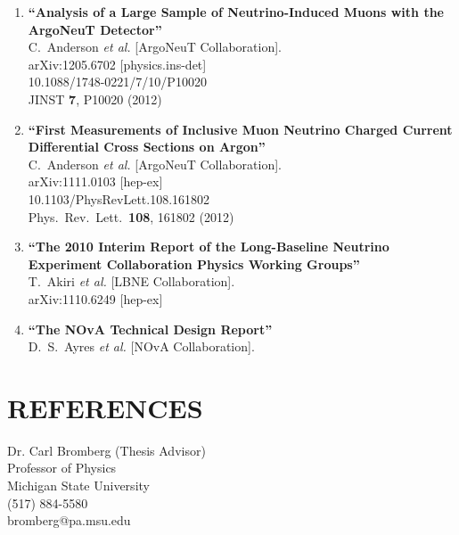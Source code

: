 \documentclass{res}
\begin{document}
\begin{resume}
\begin{enumerate}
\item%
{\bf ``Analysis of a Large Sample of Neutrino-Induced Muons with the ArgoNeuT Detector''}
  \\{}C.~Anderson {\it et al.}  [ArgoNeuT Collaboration].
  \\{}arXiv:1205.6702 [physics.ins-det]
    \\{}10.1088/1748-0221/7/10/P10020
\\{}JINST {\bf 7}, P10020 (2012) %


\item%
{\bf ``First Measurements of Inclusive Muon Neutrino Charged Current Differential Cross Sections on Argon''}
  \\{}C.~Anderson {\it et al.}  [ArgoNeuT Collaboration].
  \\{}arXiv:1111.0103 [hep-ex]
    \\{}10.1103/PhysRevLett.108.161802
\\{}Phys.\ Rev.\ Lett.\  {\bf 108}, 161802 (2012) %


\item%
{\bf ``The 2010 Interim Report of the Long-Baseline Neutrino Experiment Collaboration Physics Working Groups''}
  \\{}T.~Akiri {\it et al.}  [LBNE Collaboration].
  \\{}arXiv:1110.6249 [hep-ex]
  

\item%
{\bf ``The NOvA Technical Design Report''}
  \\{}D.~S.~Ayres {\it et al.}  [NOvA Collaboration].
  



\end{enumerate}

\section{REFERENCES}
\vspace{0.1in}

	Dr. Carl Bromberg (Thesis Advisor)\\
	Professor of Physics\\
	Michigan State University\\
	(517) 884-5580\\
	bromberg@pa.msu.edu


\end{resume}
\end{document}
